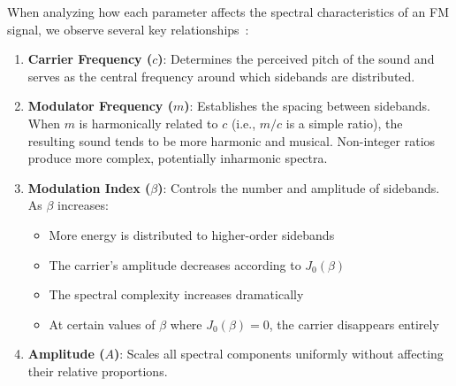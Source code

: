 \documentclass[11pt,twoside]{report}
\numberwithin{thm}{section}
\numberwithin{equation}{section}
\begin{document}
When analyzing how each parameter affects the spectral characteristics of an FM signal, we observe several key relationships~\cite{chowning1986fm}:

\begin{enumerate}
    \item \textbf{Carrier Frequency ($c$)}: Determines the perceived pitch of the sound and serves as the central frequency around which sidebands are distributed.
    
    \item \textbf{Modulator Frequency ($m$)}: Establishes the spacing between sidebands. When $m$ is harmonically related to $c$ (i.e., $m/c$ is a simple ratio), the resulting sound tends to be more harmonic and musical. Non-integer ratios produce more complex, potentially inharmonic spectra.~\cite{Chowning_1973}
    
    \item \textbf{Modulation Index ($\beta$)}: Controls the number and amplitude of sidebands. As $\beta$ increases:
    \begin{itemize}
        \item More energy is distributed to higher-order sidebands
        \item The carrier's amplitude decreases according to $J_0(\beta)$
        \item The spectral complexity increases dramatically
        \item At certain values of $\beta$ where $J_0(\beta) = 0$, the carrier disappears entirely
    \end{itemize}
    \item \textbf{Amplitude ($A$)}: Scales all spectral components uniformly without affecting their relative proportions.
\end{enumerate}
\end{document}
